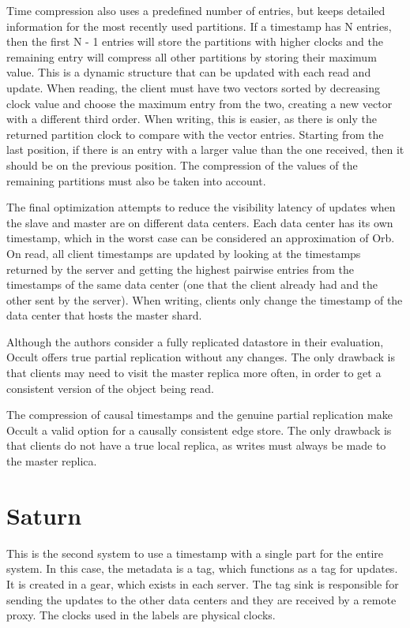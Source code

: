 Time compression also uses a predefined number of entries, but keeps detailed information for the most recently used partitions. If a timestamp has N entries, then the first N - 1 entries will store the partitions with higher clocks and the remaining entry will compress all other partitions by storing their maximum value. This is a dynamic structure that can be updated with each read and update. When reading, the client must have two vectors sorted by decreasing clock value and choose the maximum entry from the two, creating a new vector with a different third order. When writing, this is easier, as there is only the returned partition clock to compare with the vector entries. Starting from the last position, if there is an entry with a larger value than the one received, then it should be on the previous position. The compression of the values of the remaining partitions must also be taken into account. 

The final optimization attempts to reduce the visibility latency of updates when the slave and master are on different data centers. Each data center has its own timestamp, which in the worst case can be considered an approximation of Orb. On read, all client timestamps are updated by looking at the timestamps returned by the server and getting the highest pairwise entries from the timestamps of the same data center (one that the client already had and the other sent by the server). When writing, clients only change the timestamp of the data center that hosts the master shard. 

Although the authors consider a fully replicated datastore in their evaluation, Occult offers true partial replication without any changes. The only drawback is that clients may need to visit the master replica more often, in order to get a consistent version of the object being read. 

The compression of causal timestamps and the genuine partial replication make Occult a valid option for a causally consistent edge store. The only drawback is that clients do not have a true local replica, as writes must always be made to the master replica.

\section{Saturn}
\label{sec:soa:saturn}

This is the second system \cite{bravo2017saturn} to use a timestamp with a single part for the entire system. In this case, the metadata is a tag, which functions as a tag for updates. It is created in a gear, which exists in each server. The tag sink is responsible for sending the updates to the other data centers and they are received by a remote proxy. The clocks used in the labels are physical clocks. 

